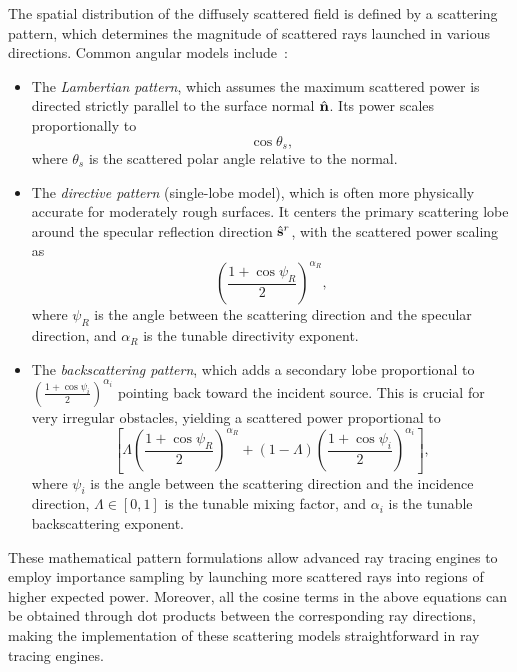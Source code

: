 The spatial distribution of the diffusely scattered field is defined by a scattering pattern, which determines the magnitude of scattered rays launched in various directions. Common angular models include~:
\begin{itemize}
  \item The \emph{Lambertian pattern}, which assumes the maximum scattered power is directed strictly parallel to the surface normal $\hat{\mathbf{n}}$. Its power scales proportionally to
    \begin{equation}
      \cos\theta_s,
    \end{equation}
    where $\theta_s$ is the scattered polar angle relative to the normal.
  \item The \emph{directive pattern} (single-lobe model), which is often more physically accurate for moderately rough surfaces. It centers the primary scattering lobe around the specular reflection direction $\hat{\mathbf{s}}^r$, with the scattered power scaling as
    \begin{equation}
      \left(\frac{1 + \cos\psi_R}{2}\right)^{\alpha_R},
    \end{equation}
    where $\psi_R$ is the angle between the scattering direction and the specular direction, and $\alpha_R$ is the tunable directivity exponent.
  \item The \emph{backscattering pattern}, which adds a secondary lobe proportional to $\left(\frac{1 + \cos\psi_i}{2}\right)^{\alpha_i}$ pointing back toward the incident source. This is crucial for very irregular obstacles, yielding a scattered power proportional to
    \begin{equation}
      \left[\Lambda\left(\frac{1 + \cos\psi_R}{2}\right)^{\alpha_R}+ \left(1-\Lambda\right)\left(\frac{1 + \cos\psi_i}{2}\right)^{\alpha_i}\right],
    \end{equation}
    where $\psi_i$ is the angle between the scattering direction and the incidence direction, $\Lambda \in [0, 1]$ is the tunable mixing factor, and $\alpha_i$ is the tunable backscattering exponent.
\end{itemize}

These mathematical pattern formulations allow advanced ray tracing engines to employ importance sampling by launching more scattered rays into regions of higher expected power. Moreover, all the cosine terms in the above equations can be obtained through dot products between the corresponding ray directions, making the implementation of these scattering models straightforward in ray tracing engines.

